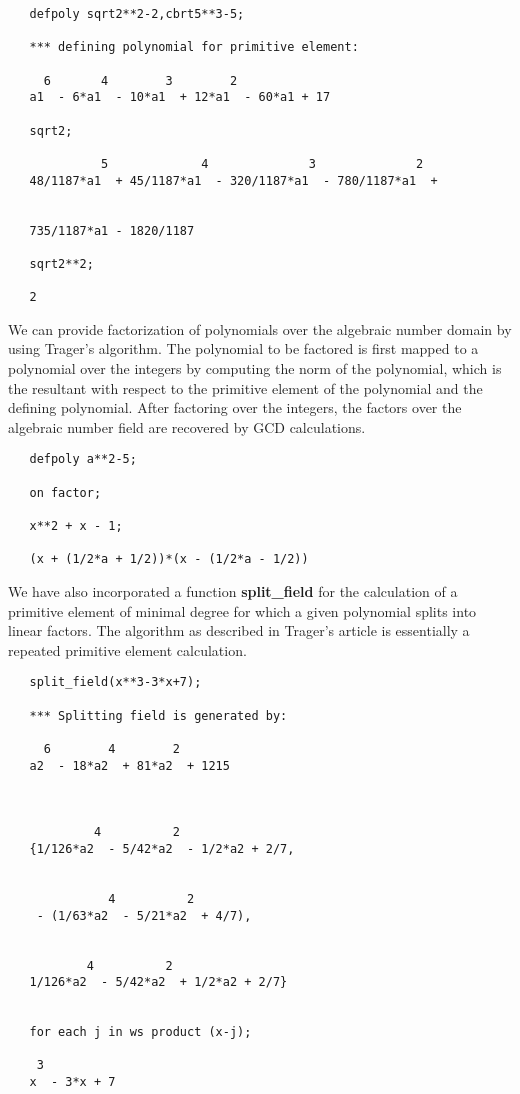 \begin{verbatim}
   defpoly sqrt2**2-2,cbrt5**3-5;

   *** defining polynomial for primitive element:

     6       4        3        2
   a1  - 6*a1  - 10*a1  + 12*a1  - 60*a1 + 17

   sqrt2;

             5             4              3              2
   48/1187*a1  + 45/1187*a1  - 320/1187*a1  - 780/1187*a1  +


   735/1187*a1 - 1820/1187

   sqrt2**2;

   2
\end{verbatim}
\newpage
We can provide factorization of polynomials over the algebraic number
domain by using Trager's algorithm.  The polynomial to be factored is first
mapped to a polynomial over the integers by computing the norm of the
polynomial, which is the resultant with respect to the primitive element of
the polynomial and the defining polynomial.  After factoring over the
integers, the factors over the algebraic number field are recovered by GCD
calculations.

\example{}

\begin{verbatim}
   defpoly a**2-5;

   on factor;

   x**2 + x - 1;

   (x + (1/2*a + 1/2))*(x - (1/2*a - 1/2))
\end{verbatim}
We have also incorporated a function {\bf split\_field} for the calculation
of a primitive element of minimal degree for which a given polynomial splits
into linear factors.  The algorithm as described in Trager's article is
essentially a repeated primitive element calculation.

\example{}

\begin{verbatim}
   split_field(x**3-3*x+7);

   *** Splitting field is generated by:

     6        4        2
   a2  - 18*a2  + 81*a2  + 1215



            4          2
   {1/126*a2  - 5/42*a2  - 1/2*a2 + 2/7,


              4          2
    - (1/63*a2  - 5/21*a2  + 4/7),


           4          2
   1/126*a2  - 5/42*a2  + 1/2*a2 + 2/7}


   for each j in ws product (x-j);

    3
   x  - 3*x + 7
\end{verbatim}

